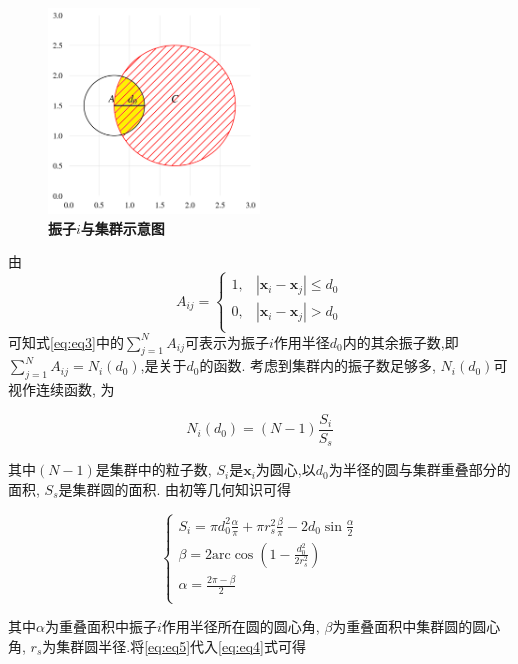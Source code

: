 \documentclass{article}
\begin{document}
\begin{figure}[H]
	\centering
	\includegraphics[width=0.5\textwidth]{./figs/circleSwarmEdges2.png}
	\caption{\small \textbf{振子$i$与集群示意图}}
	\label{fig:fig23.2}
\end{figure}

由
$$
A_{ij}=\begin{cases}
	1,&		\left| \mathbf{x}_i-\mathbf{x}_j \right|\leqslant d_0\\
	0,&		\left| \mathbf{x}_i-\mathbf{x}_j \right|>d_0\\
\end{cases}
$$
可知式\ref{eq:eq3}中的$\sum_{j=1}^N{A_{ij}}$可表示为振子$i$作用半径$d_0$内的其余振子数,即$\sum_{j=1}^N{A_{ij}}=N_i\left( d_0 \right)$,是关于$d_0$的函数. 考虑到集群内的振子数足够多, $N_i\left( d_0 \right)$可视作连续函数, 为

\begin{equation}\label{eq:eq4}
	N_i\left( d_0 \right) =\left( N-1 \right) \frac{S_i}{S_s}
\end{equation}

其中$(N-1)$是集群中的粒子数, $S_i$是$\mathbf{x}_i$为圆心,以$d_0$为半径的圆与集群重叠部分的面积, $S_s$是集群圆的面积. 由初等几何知识可得

\begin{equation}\label{eq:eq5}
	\begin{cases}
		S_i=\pi d_{0}^{2}\frac{\alpha}{\pi}+\pi r_{s}^{2}\frac{\beta}{\pi}-2d_0\sin \frac{\alpha}{2}\\
		\beta =2\mathrm{arc}\cos \left( 1-\frac{d_{0}^{2}}{2r_{s}^{2}} \right)\\
		\alpha =\frac{2\pi -\beta}{2}\\
	\end{cases}
\end{equation}

其中$\alpha$为重叠面积中振子$i$作用半径所在圆的圆心角, $\beta$为重叠面积中集群圆的圆心角, $r_s$为集群圆半径.将\ref{eq:eq5}代入\ref{eq:eq4}式可得
\end{document}
